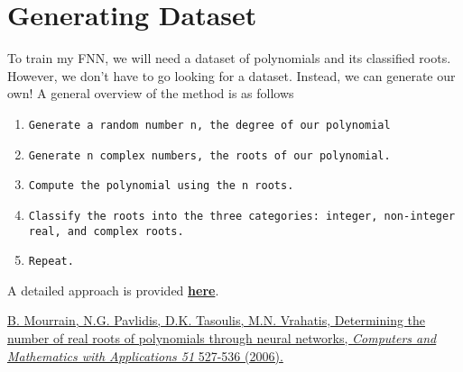 \documentclass{article}
\begin{document}
\section{Generating Dataset}
To train my FNN, we will need a dataset of polynomials and its classified roots. However, we don't have to go looking for a dataset. Instead, we can generate our own! A general overview of the method is as follows
\begin{enumerate}
\item \begin{verbatim}Generate a random number n, the degree of our polynomial\end{verbatim}
\item \begin{verbatim}Generate n complex numbers, the roots of our polynomial.\end{verbatim}
\item \begin{verbatim}Compute the polynomial using the n roots.\end{verbatim}
\item \begin{verbatim}Classify the roots into the three categories: integer, non-integer real, and complex roots.\end{verbatim}
\item \begin{verbatim}Repeat.\end{verbatim}
\end{enumerate}
A detailed approach is provided \href{https://github.com/yagnapatel/ML-Research-Project/blob/master/Generating_Dataset.ipynb}{\textbf{here}}.

\begin{thebibliography}{999}
\href{https://www.sciencedirect.com/science/article/pii/S0898122105005195}{B. Mourrain, N.G. Pavlidis, D.K. Tasoulis, M.N. Vrahatis, Determining the number of real roots of polynomials through neural networks, \textit{Computers and
Mathematics with Applications 51} 527-536 (2006).}
\end{thebibliography}
\end{document}
